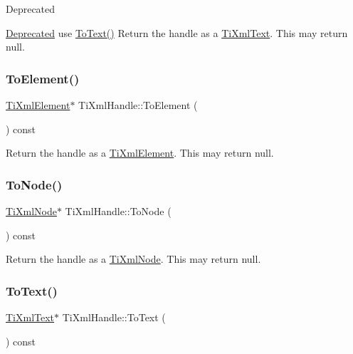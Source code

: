 \begin{DoxyRefDesc}{Deprecated}
\item[\hyperlink{deprecated__deprecated000003}{Deprecated}]use \hyperlink{class_ti_xml_handle_abde286bce1d5db0d20ec30e573278cdf}{To\+Text()} Return the handle as a \hyperlink{class_ti_xml_text}{Ti\+Xml\+Text}. This may return null. \end{DoxyRefDesc}
\mbox{\label{class_ti_xml_handle_a0e3a5333550237d899b1df2b965611a1}} 
\subsubsection{\texorpdfstring{To\+Element()}{ToElement()}}
{\footnotesize\ttfamily \hyperlink{class_ti_xml_element}{Ti\+Xml\+Element}$\ast$ Ti\+Xml\+Handle\+::\+To\+Element (\begin{DoxyParamCaption}{ }\end{DoxyParamCaption}) const\hspace{0.3cm}{\ttfamily [inline]}}

Return the handle as a \hyperlink{class_ti_xml_element}{Ti\+Xml\+Element}. This may return null. \mbox{\label{class_ti_xml_handle_a0e436dea2dd869a859e3a4486023f0fa}} 
\subsubsection{\texorpdfstring{To\+Node()}{ToNode()}}
{\footnotesize\ttfamily \hyperlink{class_ti_xml_node}{Ti\+Xml\+Node}$\ast$ Ti\+Xml\+Handle\+::\+To\+Node (\begin{DoxyParamCaption}{ }\end{DoxyParamCaption}) const\hspace{0.3cm}{\ttfamily [inline]}}

Return the handle as a \hyperlink{class_ti_xml_node}{Ti\+Xml\+Node}. This may return null. \mbox{\label{class_ti_xml_handle_abde286bce1d5db0d20ec30e573278cdf}} 
\subsubsection{\texorpdfstring{To\+Text()}{ToText()}}
{\footnotesize\ttfamily \hyperlink{class_ti_xml_text}{Ti\+Xml\+Text}$\ast$ Ti\+Xml\+Handle\+::\+To\+Text (\begin{DoxyParamCaption}{ }\end{DoxyParamCaption}) const\hspace{0.3cm}{\ttfamily [inline]}}

